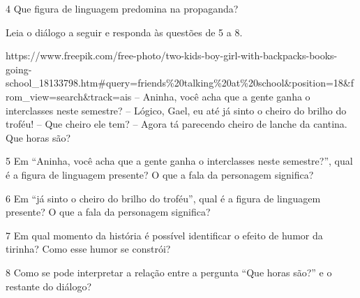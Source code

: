 \num{4} Que figura de linguagem predomina na propaganda?



Leia o diálogo a seguir e responda às questões de 5 a 8.

https://www.freepik.com/free-photo/two-kids-boy-girl-with-backpacks-books-going-school\_18133798.htm\#query=friends\%20talking\%20at\%20school\&position=18\&from\_view=search\&track=ais
-- Aninha, você acha que a gente ganha o interclasses neste semestre? --
Lógico, Gael, eu até já sinto o cheiro do brilho do troféu! -- Que
cheiro ele tem? -- Agora tá parecendo cheiro de lanche da cantina. Que
horas são?

\num{5} Em ``Aninha, você acha que a gente ganha o interclasses neste
semestre?'', qual é a figura de linguagem presente? O que a fala da
personagem significa?



\num{6} Em ``já sinto o cheiro do brilho do troféu'', qual é a figura de
linguagem presente? O que a fala da personagem significa?



\num{7} Em qual momento da história é possível identificar o efeito de
humor da tirinha? Como esse humor se constrói?



\num{8} Como se pode interpretar a relação entre a pergunta ``Que horas
são?'' e o restante do diálogo?



